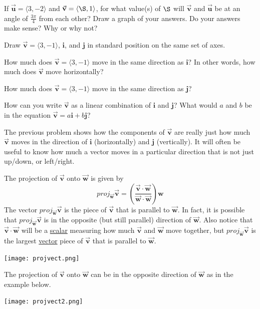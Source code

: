 \bq If $\vec{\textbf{u}}=\langle 3,-2\rangle$ and $\vec{\textbf{v}}=\langle \S,1\rangle$, for what value(s) of $\S$ will $\vec{\textbf{v}}$ and $\vec{\textbf{u}}$ be at an angle of $\frac{3 \pi}{4}$ from each other? Draw a graph of your answers. Do your answers make sense? Why or why not?
\eq

\bq\label{wert} \be
\item Draw $\vec{\textbf{v}}=\langle 3,-1\rangle$, $\textbf{i}$, and $\textbf{j}$ in standard position on the same set of axes.
\item How much does $\vec{\textbf{v}}=\langle 3,-1\rangle$ move in the same direction as $\textbf{i}$? In other words, how much does $\vec{\textbf{v}}$ move horizontally?
\item How much does $\vec{\textbf{v}}=\langle 3,-1\rangle$ move in the same direction as $\textbf{j}$?
\item How can you write $\vec{\textbf{v}}$ as a linear combination of $\textbf{i}$ and $\textbf{j}$? What would $a$ and $b$ be in the equation $\vec{\textbf{v}}= a \textbf{i}+b \textbf{j}$?
\ee
\eq

\begin{info} The previous problem shows how the components of $\vec{\textbf{v}}$ are really just how much $\vec{\textbf{v}}$ moves in the direction of $\textbf{i}$ (horizontally) and $\textbf{j}$ (vertically). It will often be useful to know how much a vector moves in a particular direction that is not just up/down, or left/right.

The projection of $\vec{\textbf{v}}$ onto $\vec{\textbf{w}}$ is given by
$$proj_{\vec{\textbf{w}}} \vec{\textbf{v}}= \left( \frac{\vec{\textbf{v}} \cdot \vec{\textbf{w}}}{\vec{\textbf{w}} \cdot \vec{\textbf{w}}} \right) \textbf{w}$$
The vector $proj_{\vec{\textbf{w}}} \vec{\textbf{v}}$ is the piece of $\vec{\textbf{v}}$ that is parallel to $\vec{\textbf{w}}$. In fact, it is possible that $proj_{\vec{\textbf{w}}} \vec{\textbf{v}}$ is in the opposite (but still parallel) direction of $\vec{\textbf{w}}$. Also notice that $\vec{\textbf{v}} \cdot \vec{\textbf{w}}$ will be a \underline{scalar} measuring how much $\vec{\textbf{v}}$ and $\vec{\textbf{w}}$ move together, but $proj_{\vec{\textbf{w}}} \vec{\textbf{v}}$ is the largest \underline{vector} piece of $\vec{\textbf{v}}$ that is parallel to $\vec{\textbf{w}}$.

\begin{center} \texttt{[image: projvect.png]} \end{center}

The projection of $\vec{\textbf{v}}$ onto $\vec{\textbf{w}}$ can be in the opposite direction of $\vec{\textbf{w}}$ as in the example below.

\begin{center} \texttt{[image: projvect2.png]} \end{center}
\end{info}

